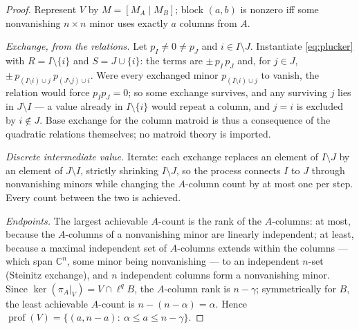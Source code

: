 \documentclass[11pt]{amsart}
\theoremstyle{definition}
\newcommand{\C}{\mathbb{C}}
\newcommand{\prof}{\operatorname{prof}}
\begin{document}
\begin{proof}
Represent $V$ by $M=[M_A\mid M_B]$; block $(a,b)$ is nonzero iff some nonvanishing $n\times n$ minor uses exactly $a$ columns from $A$.

\emph{Exchange, from the relations.} Let $p_I\ne0\ne p_J$ and $i\in I\setminus J$. Instantiate \eqref{eq:plucker} with $R=I\setminus\{i\}$ and $S=J\cup\{i\}$: the terms are $\pm\,p_I\,p_J$ and, for $j\in J$, $\pm\,p_{(I\setminus i)\cup j}\ p_{(J\setminus j)\cup i}$. Were every exchanged minor $p_{(I\setminus i)\cup j}$ to vanish, the relation would force $p_Ip_J=0$; so some exchange survives, and any surviving $j$ lies in $J\setminus I$ --- a value already in $I\setminus\{i\}$ would repeat a column, and $j=i$ is excluded by $i\notin J$. Base exchange for the column matroid is thus a consequence of the quadratic relations themselves; no matroid theory is imported.

\emph{Discrete intermediate value.} Iterate: each exchange replaces an element of $I\setminus J$ by an element of $J\setminus I$, strictly shrinking $I\setminus J$, so the process connects $I$ to $J$ through nonvanishing minors while changing the $A$-column count by at most one per step. Every count between the two is achieved.

\emph{Endpoints.} The largest achievable $A$-count is the rank of the $A$-columns: at most, because the $A$-columns of a nonvanishing minor are linearly independent; at least, because a maximal independent set of $A$-columns extends within the columns --- which span $\C^n$, some minor being nonvanishing --- to an independent $n$-set (Steinitz exchange), and $n$ independent columns form a nonvanishing minor. Since $\ker(\pi_A|_V)=V\cap\ell^qB$, the $A$-column rank is $n-\gamma$; symmetrically for $B$, the least achievable $A$-count is $n-(n-\alpha)=\alpha$. Hence $\prof(V)=\{(a,n-a):\ \alpha\le a\le n-\gamma\}$.
\end{proof}
\end{document}
